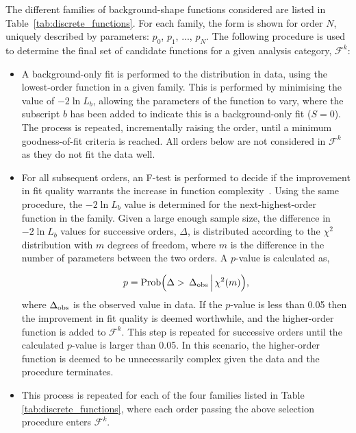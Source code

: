 The different families of background-shape functions considered are listed in Table~\ref{tab:discrete_functions}. For each family, the form is shown for order $N$, uniquely described by parameters: $p_0$, $p_1$, ..., $p_N$. The following procedure is used to determine the final set of candidate functions for a given analysis category, $\mathcal{F}^k$:
\begin{itemize}
    \item A background-only fit is performed to the \mgg distribution in data, using the lowest-order function in a given family. This is performed by minimising the value of $-2\ln{L}_b$, allowing the parameters of the function to vary, where the subscript $b$ has been added to indicate this is a background-only fit ($S=0$). 
    The process is repeated, incrementally raising the order, until a minimum goodness-of-fit criteria is reached. All orders below are not considered in $\mathcal{F}^k$ as they do not fit the data well.
    
    \item For all subsequent orders, an F-test is performed to decide if the improvement in fit quality warrants the increase in function complexity~\cite{10.2307/2340521}. Using the same procedure, the $-2\ln{L}_b$ value is determined for the next-highest-order function in the family. Given a large enough sample size, the difference in $-2\ln{L}_b$ values for successive orders, $\Delta$, is distributed according to the $\chi^2$ distribution with $m$ degrees of freedom, where $m$ is the difference in the number of parameters between the two orders. A $p$-value is calculated as,
    
    \begin{equation}
        p = {\rm{Prob}}\Big(\Delta>\,\Delta_{\rm{obs}}\,\Big|\,\chi^2(m)\Big),
    \end{equation}
    \noindent
    where $\Delta_{\rm{obs}}$ is the observed value in data. If the $p$-value is less than 0.05 then the improvement in fit quality is deemed worthwhile, and the higher-order function is added to $\mathcal{F}^k$. This step is repeated for successive orders until the calculated $p$-value is larger than 0.05. In this scenario, the higher-order function is deemed to be unnecessarily complex given the data and the procedure terminates.

    \item This process is repeated for each of the four families listed in Table \ref{tab:discrete_functions}, where each order passing the above selection procedure enters $\mathcal{F}^k$.
\end{itemize}

